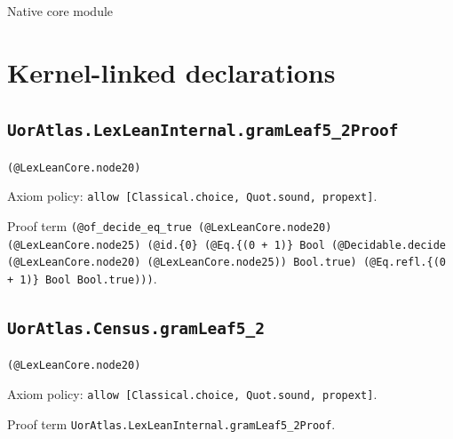 \documentclass[11pt]{article}
\begin{document}
\begin{center}{\LARGE Native core module}\end{center}
\section*{Kernel-linked declarations}
\subsection*{\texttt{UorAtlas.LexLeanInternal.gramLeaf5\_2Proof}}
\noindent\texttt{(@LexLeanCore.node20)}\par
\noindent Axiom policy: \texttt{allow [Classical.choice, Quot.sound, propext]}.\par
\noindent Proof term \texttt{(@of\_decide\_eq\_true (@LexLeanCore.node20) (@LexLeanCore.node25) (@id.\{0\} (@Eq.\{(0 + 1)\} Bool (@Decidable.decide (@LexLeanCore.node20) (@LexLeanCore.node25)) Bool.true) (@Eq.refl.\{(0 + 1)\} Bool Bool.true)))}.\par
\subsection*{\texttt{UorAtlas.Census.gramLeaf5\_2}}
\noindent\texttt{(@LexLeanCore.node20)}\par
\noindent Axiom policy: \texttt{allow [Classical.choice, Quot.sound, propext]}.\par
\noindent Proof term \texttt{UorAtlas.LexLeanInternal.gramLeaf5\_2Proof}.\par
\end{document}
